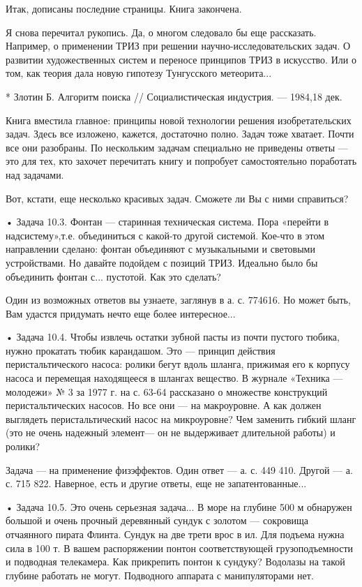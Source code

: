 Итак, дописаны последние страницы. Книга закончена.

Я снова перечитал рукопись. Да,  о многом следовало бы еще рассказать.
Например,  о  применении  ТРИЗ  при  решении  научно-исследовательских
задач. О  развитии художественных систем  и переносе принципов  ТРИЗ в
искусство.  Или о  том,  как теория  дала  новую гипотезу  Тунгусского
метеорита...

* Злотин Б.  Алгоритм поиска // Социалистическая  индустрия. — 1984,18
дек.


Книга   вместила   главное:    принципы   новой   технологии   решения
изобретательских задач. Здесь все изложено, кажется, достаточно полно.
Задач тоже  хватает. Почти  все они  разобраны. По  нескольким задачам
специально не приведены  ответы — это для тех,  кто захочет перечитать
книгу и попробует самостоятельно поработать над задачами.

Вот,  кстати, еще  несколько  красивых  задач. Сможете  ли  Вы с  ними
справиться?

• Задача 10.3. Фонтан — старинная техническая система. Пора «перейти в
надсистему»,т.е. объединиться  с какой-то  другой системой.  Кое-что в
этом направлении сделано: фонтан объединяют с музыкальными и световыми
устройствами. Но  давайте подойдем  с позиций  ТРИЗ. Идеально  было бы
объединить фонтан с... пустотой. Как это сделать?

Один из  возможных ответов  вы узнаете,  заглянув в  а. с.  774616. Но
может быть, Вам удастся придумать нечто еще более интересное...

• Задача  10.4. Чтобы  извлечь остатки зубной  пасты из  почти пустого
тюбика,  нужно  прокатать тюбик  карандашом.  Это  — принцип  действия
перистальтического  насоса: ролики  бегут вдоль  шланга, прижимая  его
к  корпусу  насоса  и  перемещая находящееся  в  шлангах  вещество.  В
журнале «Техника  — молодежи» №  3 за 1977  г. на с.  63-64 рассказано
о  множестве  конструкций  перистальтических  насосов. Но  все  они  —
на  макроуровне. А  как  должен выглядеть  перистальтический насос  на
микроуровне? Чем заменить гибкий шланг (это не очень надежный элемент—
он не выдерживает длительной работы) и ролики?

Задача  — на  применение  физэффектов. Один  ответ —  а.  с. 449  410.
Другой  — а.  с.  715 822.  Наверное,  есть и  другие  ответы, еще  не
запатентованные...


• Задача  10.5. Это очень  серьезная задача...  В море на  глубине 500
м  обнаружен  большой и  очень  прочный  деревянный сундук  с  золотом
—  сокровища  отчаянного  пирата  Флинта. Сундук  на  две  трети  врос
в  ил.  Для  подъема  нужна  сила   в  100  т.  В  вашем  распоряжении
понтон  соответствующей грузоподъемности  и подводная  телекамера. Как
прикрепить понтон  к сундуку?  Водолазы на  такой глубине  работать не
могут. Подводного аппарата с манипуляторами нет.

